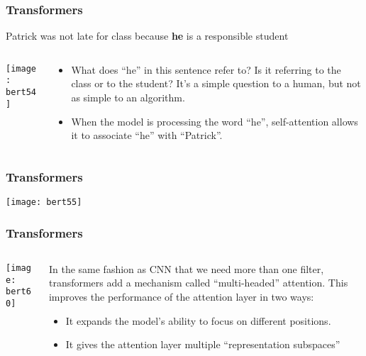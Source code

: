 \begin{frame}[fragile]\frametitle{Transformers}
Patrick was not late for class because {\bf he} is a responsible student

\begin{columns}
    \begin{column}[T]{0.5\linewidth}
			\begin{center}
			\texttt{[image: bert54]}
			\end{center}		
		\end{column}
    \begin{column}[T]{0.5\linewidth}
      \begin{itemize}
			\item What does ``he'' in this sentence refer to? Is it referring to the class or to the student? It's a simple question to a human, but not as simple to an algorithm.
			\item When the model is processing the word ``he'', self-attention allows it to associate ``he'' with ``Patrick''.
			\end{itemize}
    \end{column}
  \end{columns}
			
\end{frame}

\begin{frame}[fragile]\frametitle{Transformers}
	\begin{center}
	\texttt{[image: bert55]}
	\end{center}	
\end{frame}

\begin{frame}[fragile]\frametitle{Transformers}

\begin{columns}
    \begin{column}[T]{0.5\linewidth}
			\begin{center}
			\texttt{[image: bert60]}
			\end{center}		
		\end{column}
    \begin{column}[T]{0.5\linewidth}
		In the same fashion as CNN that we need more than one filter, transformers add a mechanism called ``multi-headed'' attention. This improves the performance of the attention layer in two ways:

      \begin{itemize}
			\item It expands the model's ability to focus on different positions.
			\item It gives the attention layer multiple ``representation subspaces''
			\end{itemize}
    \end{column}
  \end{columns}
			
\end{frame}

